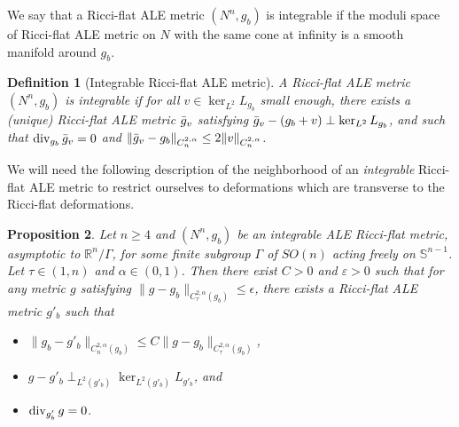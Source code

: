 \documentclass[a4paper,11pt,reqno]{amsart}
\newtheorem{defn}{Definition}[section]
\newtheorem{prop}[defn]{Proposition}
\def\RR{\mathbb{R}}
\def\div{\mathop{\rm div}\nolimits}
\def\div{\mathop{\rm div}\nolimits}
\numberwithin{equation}{section}
\begin{document}
	We say that a Ricci-flat ALE metric $(N^n,g_b)$ is integrable if the moduli space of Ricci-flat ALE metric on $N$ with the same cone at infinity is a smooth manifold around $g_b$.
	\begin{defn}[Integrable Ricci-flat ALE metric]\label{definition integrable}
		A Ricci-flat ALE metric $(N^n,g_b)$ is \emph{integrable} if for all $v\in\ker_{L^2}L_{g_b}$ small enough, there exists a (unique) Ricci-flat ALE metric $\Bar{g}_v$ satisfying $\Bar{g}_v-(g_b+v)\perp \ker_{L^2}L_{g_b}$, and such that $\div_{g_b}\Bar{g}_v=0$ and $\|\Bar{g}_v-g_b\|_{C^{2,\alpha}_{n}}\leq 2 \|v\|_{C^{2,\alpha}_{n}}$.
	\end{defn}
	
	We will need the following description of the neighborhood of an \emph{integrable} Ricci-flat ALE metric to restrict ourselves to deformations which are transverse to the Ricci-flat deformations.
	\begin{prop}\label{gauge fixing ALE integrable}
		Let $n\geqslant 4$ and $(N^n,g_b)$ be an integrable ALE Ricci-flat metric, asymptotic to $\RR^n\slash\Gamma$, for some finite subgroup $\Gamma$ of $SO(n)$ acting freely on $\mathbb{S}^{n-1}$. Let $\tau\in(1,n)$ and $\alpha\in(0,1)$. Then there exist $C>0$ and $\varepsilon>0$ such that for any metric $g$ satisfying $ \|g-g_b\|_{C^{2,\alpha}_\tau(g_b)}\leq \epsilon $, there exists a Ricci-flat ALE metric $ g'_b $ such that
		\begin{itemize}
			\item $\| g_b - g'_b \|_{C^{2,\alpha}_n(g_b)}\leq C \|g-g_b\|_{C^{2,\alpha}_\tau(g_b)}$,
			\item $ g - g'_b \perp_{L^2(g'_b)}\ker_{L^2(g'_b)}L_{g'_b} $, and
			\item $\div_{g'_b}g = 0$.
		\end{itemize}
	\end{prop}
\end{document}
